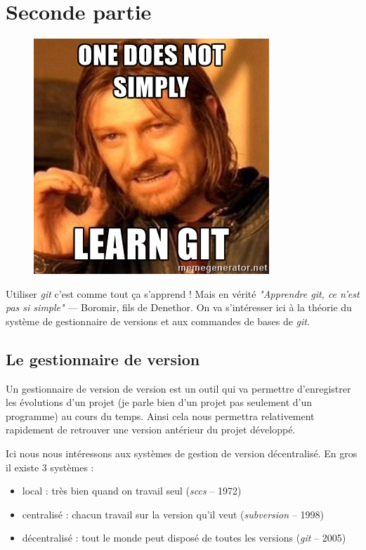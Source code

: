 \documentclass[12pt,a4paper]{article}
\begin{document}
\section{Seconde partie}

\begin{figure}
\vspace*{-1\baselineskip}
\includegraphics[width=\linewidth]{git_not_simple}
\end{figure}
Utiliser \emph{git} c'est comme tout ça s'apprend ! Mais en vérité \emph{"Apprendre git, ce n'est pas si simple"} --- Boromir, fils de Denethor. On va s'intéresser ici à la théorie du système de gestionnaire de versions et aux commandes de bases de \emph{git}.

\subsection{Le gestionnaire de version}

Un gestionnaire de version de version est un outil qui va permettre d'enregistrer les évolutions d'un projet (je parle bien d'un projet pas seulement d'un programme) au cours du temps. Ainsi cela nous permettra relativement rapidement de retrouver une version antérieur du projet développé.

Ici nous nous intéressons aux systèmes de gestion de version décentralisé. En gros il existe 3 systèmes :
\begin{itemize}
\item local : très bien quand on travail seul (\emph{sccs} -- 1972) 
\item centralisé : chacun travail sur la version qu'il veut (\emph{subversion} -- 1998)
\item décentralisé : tout le monde peut disposé de toutes les versions (\emph{git} -- 2005)
\end{itemize}
\end{document}
